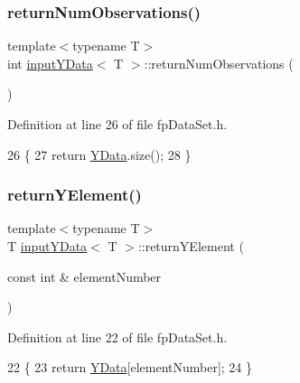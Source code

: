 \subsubsection{\texorpdfstring{return\+Num\+Observations()}{returnNumObservations()}}
{\footnotesize\ttfamily template$<$typename T$>$ \\
int \hyperlink{classinputYData}{input\+Y\+Data}$<$ T $>$\+::return\+Num\+Observations (\begin{DoxyParamCaption}{ }\end{DoxyParamCaption})\hspace{0.3cm}{\ttfamily [inline]}}



Definition at line 26 of file fp\+Data\+Set.\+h.


\begin{DoxyCode}
26                                           \{
27             \textcolor{keywordflow}{return} \hyperlink{classinputYData_a0b1d0b2e92ec4351f8a098a365fd9746}{YData}.size();
28         \}
\end{DoxyCode}
\mbox{\label{classinputYData_affffd6432eaa11acc46fc83fb4ce409a}} 
\subsubsection{\texorpdfstring{return\+Y\+Element()}{returnYElement()}}
{\footnotesize\ttfamily template$<$typename T$>$ \\
T \hyperlink{classinputYData}{input\+Y\+Data}$<$ T $>$\+::return\+Y\+Element (\begin{DoxyParamCaption}\item[{const int \&}]{element\+Number }\end{DoxyParamCaption})\hspace{0.3cm}{\ttfamily [inline]}}



Definition at line 22 of file fp\+Data\+Set.\+h.


\begin{DoxyCode}
22                                                          \{
23             \textcolor{keywordflow}{return} \hyperlink{classinputYData_a0b1d0b2e92ec4351f8a098a365fd9746}{YData}[elementNumber];
24         \}
\end{DoxyCode}
\mbox{\label{classinputYData_a61b9bdd63af5bc6aa071185a5cf1c093}} 
